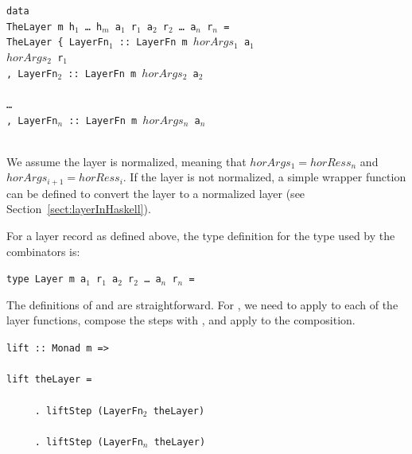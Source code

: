 \documentclass{llncs}
\begin{document}
\begin{small}
\begin{tabbing}
{\tt da}\={\tt ta}\\
\> {\tt Th}\={\tt eLayer~m h$_1$ \dots ~h$_m$ a$_1$ r$_1$ a$_2$ r$_2$ \dots ~a$_n$ r$_n$ = }\\
\> \> {\tt TheLayer~}\={\tt \{~LayerFn$_1$}\verb| :: |{\tt LayerFn~m~}\= {\tt $horArgs_1$ a$_1$}\\
\> \>                \>                                             \> {\tt $horArgs_2$ r$_1$}\\
\>\>\> {\tt , LayerFn$_2$}\verb| :: |{\tt LayerFn~m~}\={\tt $horArgs_2$ a$_2$}\\
\> \>                \>                            \\
\>\>\> {\tt \dots }\\
\>\>\> {\tt , LayerFn$_n$}\verb| :: |{\tt LayerFn~m~}\={\tt $horArgs_{n}$ a$_n$}\\
\> \>                \>                            \\
\end{tabbing}
\end{small}

We assume the layer is normalized, meaning that $horArgs_{1} = horRess_n$ and 
$horArgs_{i+1} = horRess_i$. If the layer is not normalized, a simple wrapper function can be defined to convert the layer to a normalized layer (see Section~\ref{sect:layerInHaskell}). 

For a layer record as defined above, the type definition for the  type used by the combinators is:

\begin{small}
\begin{tabbing}
{\tt ty}\={\tt pe Layer m a$_1$ r$_1$ a$_2$ r$_2$ \dots ~a$_n$ r$_n$ =}\\
\end{tabbing}
\end{small}

The definitions of  and  are straightforward. For , we need to apply  to each of the layer functions, compose the steps with , and apply  to the composition. 

\begin{small}
\begin{tabbing}
{\tt lift}\verb| :: |\={\tt Monad m =>}\\
                     \\
{\tt li}\={\tt ft t}\={\tt heLayer = }\\
\\
\>\verb|     . lift|{\tt Step (LayerFn$_2$ theLayer)}\\
\>{\tt ~~~~~\dots}\\ 
\>\verb|     . lift|{\tt Step (LayerFn$_n$ theLayer)}
\end{tabbing}
\end{small}%
\end{document}
